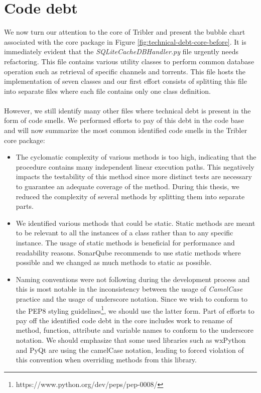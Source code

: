 \section{Code debt}
We now turn our attention to the core of Tribler and present the bubble chart associated with the core package in Figure \ref{fig:technical-debt-core-before}. It is immediately evident that the \emph{SQLiteCacheDBHandler.py} file urgently needs refactoring. This file contains various utility classes to perform common database operation such as retrieval of specific channels and torrents. This file hosts the implementation of seven classes and our first effort consists of splitting this file into separate files where each file contains only one class definition.\\\\
However, we still identify many other files where technical debt is present in the form of code smells. We performed efforts to pay of this debt in the code base and will now summarize the most common identified code smells in the Tribler core package:
\begin{itemize}
	\item The cyclomatic complexity of various methods is too high, indicating that the procedure contains many independent linear execution paths. This negatively impacts the testability of this method since more distinct tests are necessary to guarantee an adequate coverage of the method. During this thesis, we reduced the complexity of several methods by splitting them into separate parts.
	\item We identified various methods that could be static. Static methods are meant to be relevant to all the instances of a class rather than to any specific instance. The usage of static methods is beneficial for performance and readability reasons. SonarQube recommends to use static methods where possible and we changed as much methods to static as possible.
	\item Naming conventions were not following during the development process and this is most notable in the inconsistency between the usage of \emph{CamelCase} practice and the usage of underscore notation. Since we wish to conform to the PEP8 styling guidelines\footnote{https://www.python.org/dev/peps/pep-0008/}, we should use the latter form. Part of efforts to pay off the identified code debt in the core includes work to rename of method, function, attribute and variable names to conform to the underscore notation. We should emphasize that some used libraries such as wxPython and PyQt are using the camelCase notation, leading to forced violation of this convention when overriding methods from this library.
\end{itemize}
